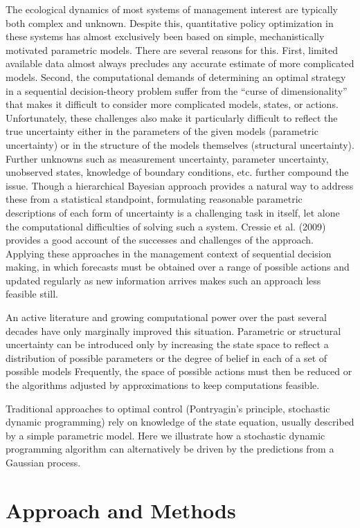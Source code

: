 \documentclass[author-year, review]{elsarticle} %
\begin{document}
The ecological dynamics of most systems of management interest are
typically both complex and unknown. Despite this, quantitative policy
optimization in these systems has almost exclusively been based on
simple, mechanistically motivated parametric models. There are several
reasons for this. First, limited available data almost always precludes
any accurate estimate of more complicated models. Second, the
computational demands of determining an optimal strategy in a sequential
decision-theory problem suffer from the ``curse of dimensionality'' that
makes it difficult to consider more complicated models, states, or
actions. Unfortunately, these challenges also make it particularly
difficult to reflect the true uncertainty either in the parameters of
the given models (parametric uncertainty) or in the structure of the
models themselves (structural uncertainty). Further unknowns such as
measurement uncertainty, parameter uncertainty, unobserved states,
knowledge of boundary conditions, etc. further compound the issue.
Though a hierarchical Bayesian approach provides a natural way to
address these from a statistical standpoint, formulating reasonable
parametric descriptions of each form of uncertainty is a challenging
task in itself, let alone the computational difficulties of solving such
a system. Cressie et al. (2009) provides a good account of the successes
and challenges of the approach. Applying these approaches in the
management context of sequential decision making, in which forecasts
must be obtained over a range of possible actions and updated regularly
as new information arrives makes such an approach less feasible still.

An active literature and growing computational power over the past
several decades have only marginally improved this situation. Parametric
or structural uncertainty can be introduced only by increasing the state
space to reflect a distribution of possible parameters or the degree of
belief in each of a set of possible models Frequently, the space of
possible actions must then be reduced or the algorithms adjusted by
approximations to keep computations feasible.

Traditional approaches to optimal control (Pontryagin's principle,
stochastic dynamic programming) rely on knowledge of the state equation,
usually described by a simple parametric model. Here we illustrate how a
stochastic dynamic programming algorithm can alternatively be driven by
the predictions from a Gaussian process.

\section{Approach and Methods}
\end{document}
